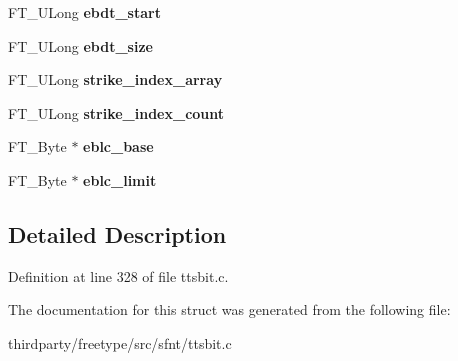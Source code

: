 \begin{DoxyCompactItemize}
\item 
\mbox{\label{struct_t_t___s_bit_decoder_rec___ae9b4aed73448734dd5dc4100fe1c60c6}} 
F\+T\+\_\+\+U\+Long {\bfseries ebdt\+\_\+start}
\item 
\mbox{\label{struct_t_t___s_bit_decoder_rec___ad0b375900a0d51cdf4aaf3669ba1d70a}} 
F\+T\+\_\+\+U\+Long {\bfseries ebdt\+\_\+size}
\item 
\mbox{\label{struct_t_t___s_bit_decoder_rec___a245d99faa2154567dc2e64ad118625b4}} 
F\+T\+\_\+\+U\+Long {\bfseries strike\+\_\+index\+\_\+array}
\item 
\mbox{\label{struct_t_t___s_bit_decoder_rec___a613ec3a3a537e8de0aeac07a7ca40cd9}} 
F\+T\+\_\+\+U\+Long {\bfseries strike\+\_\+index\+\_\+count}
\item 
\mbox{\label{struct_t_t___s_bit_decoder_rec___a3bce27d2d0382ffa7a864853842d9e0d}} 
F\+T\+\_\+\+Byte $\ast$ {\bfseries eblc\+\_\+base}
\item 
\mbox{\label{struct_t_t___s_bit_decoder_rec___aecd21d89a328a83aa17e89d451837689}} 
F\+T\+\_\+\+Byte $\ast$ {\bfseries eblc\+\_\+limit}
\end{DoxyCompactItemize}


\subsection{Detailed Description}


Definition at line 328 of file ttsbit.\+c.



The documentation for this struct was generated from the following file\+:\begin{DoxyCompactItemize}
\item 
thirdparty/freetype/src/sfnt/ttsbit.\+c\end{DoxyCompactItemize}
